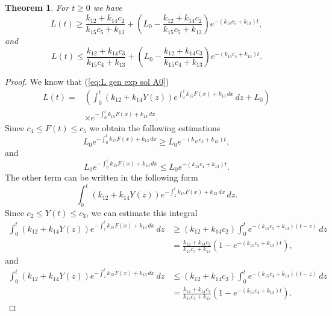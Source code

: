 \documentclass[pdflatex,sn-mathphys-num]{sn-jnl}
\theoremstyle{thmstyleone}
\newtheorem{theorem}{Theorem}[section]
\theoremstyle{thmstyletwo}
\theoremstyle{thmstylethree}
\begin{document}
\begin{theorem}
For $t\geq 0$ we have
\begin{equation*}
L(t) \geq \frac{k_{12}+k_{14}c_2}{k_{15}c_5+k_{13}}+
\left( L_0-\frac{k_{12}+k_{14}c_2}{k_{15}c_5+k_{13}} \right)e^{-(k_{15}c_5+k_{13})t},
\end{equation*}
and
\begin{equation*}
L(t) \leq \frac{k_{12}+k_{14}c_3}{k_{15}c_4+k_{13}}+
\left( L_0-\frac{k_{12}+k_{14}c_3}{k_{15}c_4+k_{13}} \right)e^{-(k_{15}c_4+k_{13})t}.
\end{equation*}
\end{theorem}
\begin{proof}
We know that (\eqref{eq:L gen exp sol A0})
\begin{align*}
L(t) = & \left(\int_0^t \left( k_{12} + k_{14}Y(z) \right) 
e^{\int_0^z k_{15}F(x)+k_{13} \, dx} \, dz +L_0 \right) \\
   &\times e^{-\int_0^t k_{15}F(x)+k_{13} \, dx}. 
\end{align*}
Since $c_4\leq F(t)\leq c_5$ we obtain the following estimations
\begin{equation}
 L_0 e^{-\int_0^t k_{15}F(x)+k_{13} \, dx}\geq L_0 e^{-(k_{15}c_5+k_{13})t},
\end{equation}
and 
\begin{equation}
 L_0 e^{-\int_0^t k_{15}F(x)+k_{13} \, dx}\leq L_0 e^{-(k_{15}c_4+k_{13})t}.
\end{equation}
The other term can be written in the following form
\begin{equation}
\int_0^t \left( k_{12} + k_{14}Y(z) \right) 
e^{-\int_z^t k_{15}F(x)+k_{13} \, dx} \, dz. 
\end{equation}
Since  $c_2\leq Y(t)\leq c_3$,  we can estimate this integral 
\begin{align}
\int_0^t \left( k_{12} + k_{14}Y(z) \right) 
e^{-\int_z^t k_{15}F(x)+k_{13} \, dx} \, dz &\geq (k_{12}+k_{14}c_2) 
\int_0^t e^{-(k_{15}c_5+k_{13})(t-z)}\,dz \nonumber\\
&=\frac{k_{12}+k_{14}c_2}{k_{15}c_5+k_{13}}\left(1-e^{-(k_{15}c_5+k_{13})t}  \right),
\end{align}
and
\begin{align}
\int_0^t \left( k_{12} + k_{14}Y(z) \right) 
e^{-\int_z^t k_{15}F(x)+k_{13} \, dx} \, dz &\leq (k_{12}+k_{14}c_3) 
\int_0^t e^{-(k_{15}c_4+k_{13})(t-z)}\,dz \nonumber\\
&=\frac{k_{12}+k_{14}c_3}{k_{15}c_4+k_{13}}\left(1-e^{-(k_{15}c_4+k_{13})t}  \right).
\end{align}
\end{proof}
\end{document}
